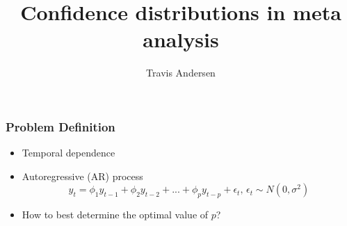 \documentclass{beamer}
\title{Confidence distributions in meta analysis}
\author{Travis Andersen}
\begin{document}
\begin{frame}
  \maketitle
\end{frame}

\begin{frame}
  \frametitle{Problem Definition}
    \begin{itemize}
      \item Temporal dependence
      \item Autoregressive (AR) process
      \begin{equation*}
        y_t = \phi_1 y_{t-1}+\phi_2 y_{t-2} + ... + \phi_p y_{t-p} + \epsilon_t, \, \epsilon_t \sim N(0, \sigma^2)
      \end{equation*}
      \item How to best determine the optimal value of $p$?
    \end{itemize}
  \end{frame}
\end{document}
